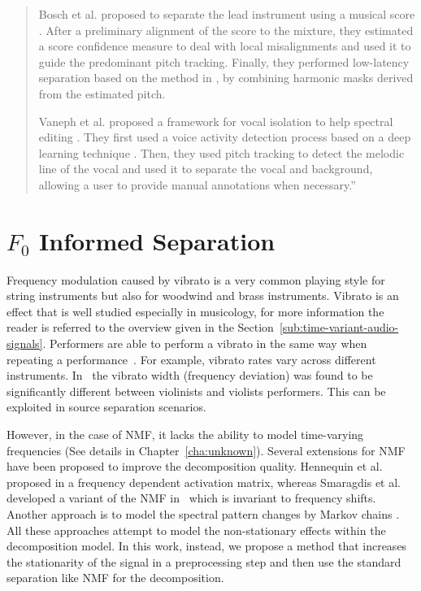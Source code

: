 \begin{quote}
\par
Bosch et al. proposed to separate the lead instrument using a musical score \cite{bosch12}. After a preliminary alignment of the score to the mixture, they estimated a score confidence measure to deal with local misalignments and used it to guide the predominant pitch tracking. Finally, they performed low-latency separation based on the method in \cite{marxer12}, by combining harmonic masks derived from the estimated pitch.
\par
Vaneph et al. proposed a framework for vocal isolation to help spectral editing \cite{vaneph16}. They first used a voice activity detection process based on a deep learning technique \cite{Leglaive15}. Then, they used pitch tracking to detect the melodic line of the vocal and used it to separate the vocal and background, allowing a user to provide manual annotations when necessary.''
\end{quote}

\section{$F_0$ Informed Separation}
\label{sub:frequency_modulation}


Frequency modulation caused by vibrato is a very common playing style for string instruments but also for woodwind and brass instruments.
Vibrato is an effect that is well studied especially in musicology, for more information the reader is referred to the overview given in the Section~\ref{sub:time-variant-audio-signals}.
Performers are able to perform a vibrato in the same way when repeating a performance~\cite{fletcher01}.
For example, vibrato rates vary across different instruments.
In~\cite{macleod06} the vibrato width (frequency deviation) was found to be significantly different between violinists and violists performers.
This can be exploited in source separation scenarios.
\par
However, in the case of \acs{NMF}, it lacks the ability to model time-varying frequencies (See details in Chapter~\ref{cha:unknown}).
Several extensions for \acs{NMF} have been proposed to improve the decomposition quality.
Hennequin et al. proposed in \cite{hennequin11} a frequency dependent activation matrix, whereas Smaragdis et al. developed a variant of the \acs{NMF} in~\cite{smaragdis08} which is invariant to frequency shifts.
Another approach is to model the spectral pattern changes by Markov chains \cite{nakano10}. All these approaches attempt to model the non-stationary effects within the decomposition model.
In this work, instead, we propose a method that increases the stationarity of the signal in a preprocessing step and then use the standard separation like \acs{NMF} for the decomposition.\\

